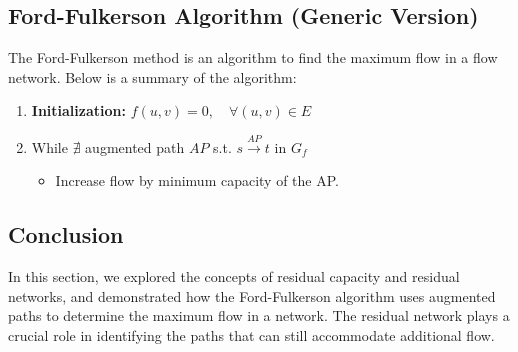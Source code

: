 \subsection{Ford-Fulkerson Algorithm (Generic Version)}
\begin{algo}
    The Ford-Fulkerson method is an algorithm to find the maximum flow in a flow network. Below is a summary of the algorithm:

    \begin{enumerate}
        \item \textbf{Initialization:} $f(u, v) = 0, \quad \forall (u, v) \in E$
        \item While $\nexists$ augmented path $AP$ s.t. $s \overset{AP}{\rightarrow} t$ in $G_f$
        \begin{itemize}
            \item Increase flow by minimum capacity of the AP.
        \end{itemize}
    \end{enumerate}
\end{algo}

\subsection{Conclusion}
\begin{summary}
    In this section, we explored the concepts of residual capacity and residual networks, and demonstrated how the Ford-Fulkerson algorithm uses augmented paths to determine the maximum flow in a network. The residual network plays a crucial role in identifying the paths that can still accommodate additional flow.
\end{summary}

